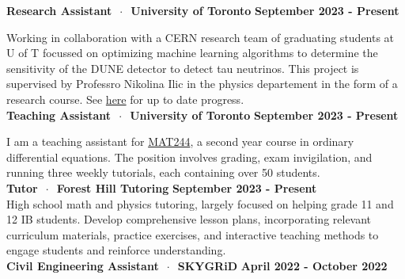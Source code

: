 \documentclass{article}
\begin{document}
\begin{spacing}{1.2}
\textbf{Research Assistant} $ \ \cdot \ $ \small{\textbf{University of Toronto}} \hspace{\fill} \textbf{September 2023 - Present}\\
\normalsize 

Working in collaboration with a CERN research team of graduating students at U of T focussed 
on optimizing machine learning algorithms to determine the sensitivity of the DUNE detector 
to detect tau neutrinos. This project is supervised by Professro Nikolina Ilic in the physics departement
in the form of a research course. See \href{https://arxiv.org/abs/2308.03288}{\color{blue}here} 
for up to date progress. \\[0.10cm]


\textbf{Teaching Assistant} $ \ \cdot \ $ \small{\textbf{University of Toronto}} \hspace{\fill} \textbf{September 2023 - Present}\\
\normalsize 

I am a teaching assistant for \href{https://artsci.calendar.utoronto.ca/course/mat244h1}{\color{blue}MAT244}, 
a second year course in ordinary differential equations. The position involves grading, 
exam invigilation, and running three weekly tutorials, each containing over 50 students.\\[0.10cm]


\textbf{Tutor} $ \ \cdot \ $ \small{\textbf{Forest Hill Tutoring}} \hspace{\fill} \textbf{September 2023 - Present}\\
\normalsize 
High school math and physics tutoring, largely focused on helping grade 11 and 12 IB students. 
Develop comprehensive lesson plans, incorporating relevant curriculum materials, practice 
exercises, and interactive teaching methods to engage students and reinforce understanding.\\[0.10cm]



\textbf{Civil Engineering Assistant} $ \ \cdot \ $ \small{\textbf{SKYGRiD}} \hspace{\fill} \textbf{April 2022 - October 2022}\\
\normalsize 


\end{spacing}
\end{document}
